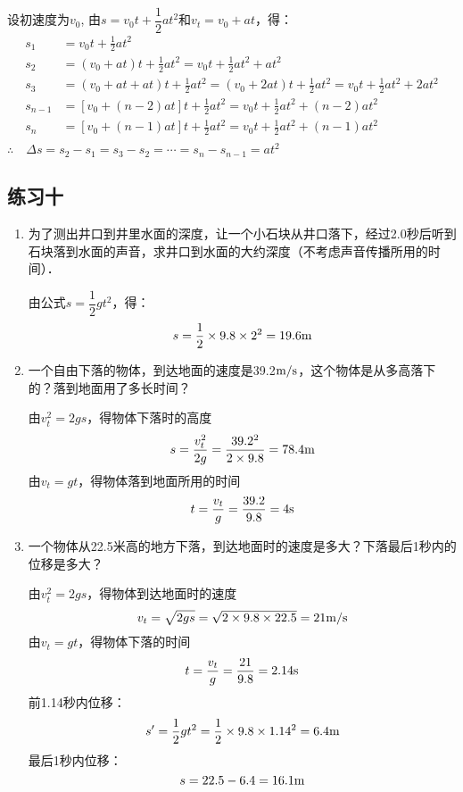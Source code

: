 \begin{enumerate}
\begin{solution}
    设初速度为$v_0$, 由$s=v_0t+\dfrac{1}{2}at^2$和$v_t=v_0+at$，得：
\[\begin{split}
    s_1&=v_0t+\frac{1}{2}at^2\\
    s_2&=(v_0+at)t+\frac{1}{2}at^2=v_0t+\frac{1}{2}at^2+at^2\\
    s_3&=(v_0+at+at)t+\frac{1}{2}at^2=(v_0+2at)t+\frac{1}{2}at^2=v_0t+\frac{1}{2}at^2+2at^2\\
s_{n-1}&=[v_0+(n-2)at]t+\frac{1}{2}at^2=v_0 t+\frac{1}{2}at^2+(n-2)at^2\\
s_{n}&=[v_0+(n-1)at]t+\frac{1}{2}at^2=v_0 t+\frac{1}{2}at^2+(n-1)at^2\\
\end{split}\]
$\therefore\quad \Delta s=s_2-s_1=s_3-s_2=\cdots=s_n-s_{n-1}=at^2$
\end{solution}
\end{enumerate}


\subsection{练习十}
\begin{enumerate}
	\item 为了测出井口到井里水面的深度，让一个小石块从井口落下，经过2.0秒后听到石块落到水面的声音，求井口到水面的大约深度（不考虑声音传播所用的时间）．

    \begin{solution}
 由公式$s=\dfrac{1}{2}gt^2$，得： 
 \[s=\frac{1}{2}\times 9.8\times 2^2=19.6{\rm m}\]      
    \end{solution}
\item 一个自由下落的物体，到达地面的速度是39.2$\text{m}/\text{s}$，这个物体是从多高落下的？落到地面用了多长时间？

\begin{solution}
由$v^2_t=2gs$，得物体下落时的高度
\[s=\frac{v^2_t}{2g}=\frac{39.2^2}{2\times 9.8}=78.4{\rm m}\]
由$v_t=gt$，得物体落到地面所用的时间
\[t=\frac{v_t}{g}=\frac{39.2}{9.8}=4{\rm s}\]
\end{solution}
\item 一个物体从22.5米高的地方下落，到达地面时的速度是多大？下落最后1秒内的位移是多大？

\begin{solution}
    由$v^2_t=2gs$，得物体到达地面时的速度
\[v_t=\sqrt{2gs}=\sqrt{2\times 9.8\times 22.5}=21{\rm m/s}\]
由$v_t=gt$，得物体下落的时间 
\[t=\frac{v_t}{g}=\frac{21}{9.8}=2.14{\rm s}\]
前1.14秒内位移：
\[s'=\frac{1}{2}gt^2=\frac{1}{2}\times 9.8\times 1.14^2=6.4{\rm m}\]
最后1秒内位移：
\[s=22.5-6.4=16.1{\rm m}\]
\end{solution}
\end{enumerate}




